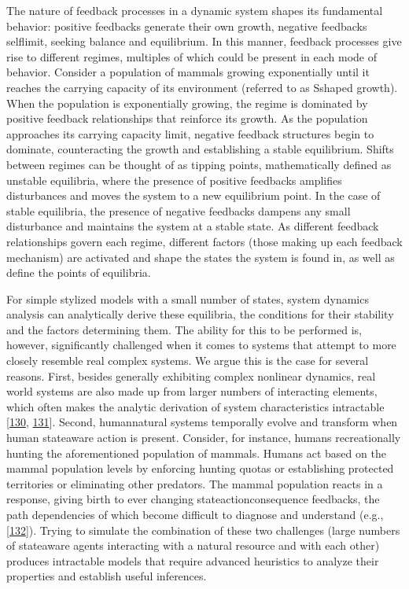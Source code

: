 \documentclass[letterpaper,10pt,english]{sphinxmanual}
\begin{document}
\sphinxAtStartPar
The nature of feedback processes in a dynamic system shapes its fundamental behavior: positive feedbacks generate their own growth, negative feedbacks self\sphinxhyphen{}limit, seeking balance and equilibrium. In this manner, feedback processes give rise to different regimes, multiples of which could be present in each mode of behavior. Consider a population of mammals growing exponentially until it reaches the carrying capacity of its environment (referred to as S\sphinxhyphen{}shaped growth). When the population is exponentially growing, the regime is dominated by positive feedback relationships that reinforce its growth. As the population approaches its carrying capacity limit, negative feedback structures begin to dominate, counteracting the growth and establishing a stable equilibrium. Shifts between regimes can be thought of as tipping points, mathematically defined as unstable equilibria, where the presence of positive feedbacks amplifies disturbances and moves the system to a new equilibrium point. In the case of stable equilibria, the presence of negative feedbacks dampens any small disturbance and maintains the system at a stable state. As different feedback relationships govern each regime, different factors (those making up each feedback mechanism) are activated and shape the states the system is found in, as well as define the points of equilibria.

\sphinxAtStartPar
For simple stylized models with a small number of states, system dynamics analysis can analytically derive these equilibria, the conditions for their stability and the factors determining them. The ability for this to be performed is, however, significantly challenged when it comes to systems that attempt to more closely resemble real complex systems. We argue this is the case for several reasons. First, besides generally exhibiting complex nonlinear dynamics, real world systems are also made up from larger numbers of interacting elements, which often makes the analytic derivation of system characteristics intractable {[}\hyperlink{cite.index:id59}{130}, \hyperlink{cite.index:id58}{131}{]}. Second, human\sphinxhyphen{}natural systems temporally evolve and transform when human state\sphinxhyphen{}aware action is present. Consider, for instance, humans recreationally hunting the aforementioned population of mammals. Humans act based on the mammal population levels by enforcing hunting quotas or establishing protected territories or eliminating other predators. The mammal population reacts in a response, giving birth to ever changing state\sphinxhyphen{}action\sphinxhyphen{}consequence feedbacks, the path dependencies of which become difficult to diagnose and understand (e.g., {[}\hyperlink{cite.index:id60}{132}{]}). Trying to simulate the combination of these two challenges (large numbers of state\sphinxhyphen{}aware agents interacting with a natural resource and with each other) produces intractable models that require advanced heuristics to analyze their properties and establish useful inferences.
\end{document}
